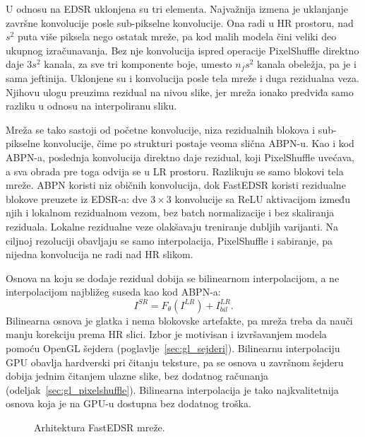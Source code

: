\documentclass[12pt,a4paper]{article}
\begin{document}
U odnosu na EDSR uklonjena su tri elementa. Najvažnija izmena je uklanjanje završne konvolucije posle sub-pikselne konvolucije. Ona radi u HR prostoru, nad $s^2$ puta više piksela nego ostatak mreže, pa kod malih modela čini veliki deo ukupnog izračunavanja. Bez nje konvolucija ispred operacije PixelShuffle direktno daje $3s^2$ kanala, za sve tri komponente boje, umesto $n_f s^2$ kanala obeležja, pa je i sama jeftinija. Uklonjene su i konvolucija posle tela mreže i duga rezidualna veza. Njihovu ulogu preuzima rezidual na nivou slike, jer mreža ionako predviđa samo razliku u odnosu na interpoliranu sliku.

Mreža se tako sastoji od početne konvolucije, niza rezidualnih blokova i sub-pikselne konvolucije, čime po strukturi postaje veoma slična ABPN-u. Kao i kod ABPN-a, poslednja konvolucija direktno daje rezidual, koji PixelShuffle uvećava, a sva obrada pre toga odvija se u LR prostoru. Razlikuju se samo blokovi tela mreže. ABPN koristi niz običnih konvolucija, dok FastEDSR koristi rezidualne blokove preuzete iz EDSR-a: dve $3\times3$ konvolucije sa ReLU aktivacijom između njih i lokalnom rezidualnom vezom, bez batch normalizacije i bez skaliranja reziduala. Lokalne rezidualne veze olakšavaju treniranje dubljih varijanti. Na ciljnoj rezoluciji obavljaju se samo interpolacija, PixelShuffle i sabiranje, pa nijedna konvolucija ne radi nad HR slikom.

Osnova na koju se dodaje rezidual dobija se bilinearnom interpolacijom, a ne interpolacijom najbližeg suseda kao kod ABPN-a:
\begin{equation}
	I^{SR} = F_{\theta}(I^{LR}) + I^{LR}_{bil}.
\end{equation}
Bilinearna osnova je glatka i nema blokovske artefakte, pa mreža treba da nauči manju korekciju prema HR slici. Izbor je motivisan i izvršavanjem modela pomoću OpenGL šejdera (poglavlje~\ref{sec:gl_sejderi}). Bilinearnu interpolaciju GPU obavlja hardverski pri čitanju teksture, pa se osnova u završnom šejderu dobija jednim čitanjem ulazne slike, bez dodatnog računanja (odeljak~\ref{sec:gl_pixelshuffle}). Bilinearna interpolacija je tako najkvalitetnija osnova koja je na GPU-u dostupna bez dodatnog troška.

\begin{figure}[H]
	\centering
	\resizebox{0.9\textwidth}{!}{}
	\caption{Arhitektura FastEDSR mreže.}
	\label{fig:fastedsr}
\end{figure}

\end{document}
